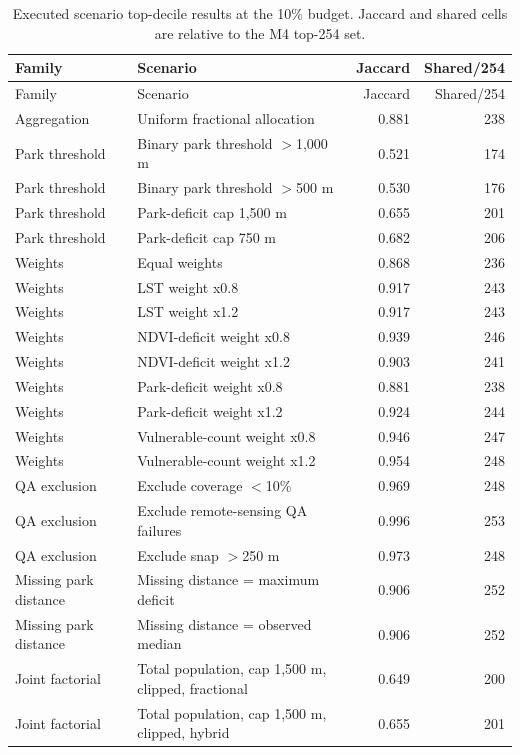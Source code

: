 \begin{longtable}{@{}p{} p{} r r@{}}
\caption{Executed scenario top-decile results at the 10\% budget. Jaccard and shared cells are relative to the M4 top-254 set.}\label{tab:s7}\\
\toprule
Family & Scenario & Jaccard & Shared/254 \\
\midrule
\endfirsthead
\toprule
Family & Scenario & Jaccard & Shared/254 \\
\midrule
\endhead
\bottomrule
\endfoot
Aggregation & Uniform fractional allocation & 0.881 & 238 \\
Park threshold & Binary park threshold $>$1,000 m & 0.521 & 174 \\
Park threshold & Binary park threshold $>$500 m & 0.530 & 176 \\
Park threshold & Park-deficit cap 1,500 m & 0.655 & 201 \\
Park threshold & Park-deficit cap 750 m & 0.682 & 206 \\
Weights & Equal weights & 0.868 & 236 \\
Weights & LST weight x0.8 & 0.917 & 243 \\
Weights & LST weight x1.2 & 0.917 & 243 \\
Weights & NDVI-deficit weight x0.8 & 0.939 & 246 \\
Weights & NDVI-deficit weight x1.2 & 0.903 & 241 \\
Weights & Park-deficit weight x0.8 & 0.881 & 238 \\
Weights & Park-deficit weight x1.2 & 0.924 & 244 \\
Weights & Vulnerable-count weight x0.8 & 0.946 & 247 \\
Weights & Vulnerable-count weight x1.2 & 0.954 & 248 \\
QA exclusion & Exclude coverage $<$10\% & 0.969 & 248 \\
QA exclusion & Exclude remote-sensing QA failures & 0.996 & 253 \\
QA exclusion & Exclude snap $>$250 m & 0.973 & 248 \\
Missing park distance & Missing distance = maximum deficit & 0.906 & 252 \\
Missing park distance & Missing distance = observed median & 0.906 & 252 \\
Joint factorial & Total population, cap 1,500 m, clipped, fractional & 0.649 & 200 \\
Joint factorial & Total population, cap 1,500 m, clipped, hybrid & 0.655 & 201 \\

\end{longtable}
